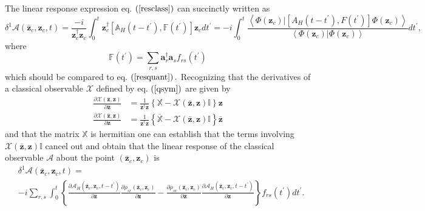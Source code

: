 \documentclass[aps,preprint]{revtex4}%
\begin{document}
The linear response expression eq. $\left(  \ref{resclass}\right)  $ can
succinctly written as
\begin{equation}
\delta^{1}\mathcal{A}\left(  \mathbf{\bar{z}}_{c},\mathbf{z}_{c},t\right)
=\frac{-i}{\mathbf{z}_{c}^{\dagger}\mathbf{z}_{c}}\int_{0}^{t}\mathbf{z}%
_{c}^{\dagger}\left[  \mathbb{A}_{H}\left(  t-t^{\prime}\right)
,\mathbb{F}\left(  t^{\prime}\right)  \right]  \mathbf{z}_{c}dt^{\prime
}=-i\int_{0}^{t}\frac{\left\langle \left.  \Phi\left(  \mathbf{z}_{c}\right)
\right\vert \left[  A_{H}\left(  t-t^{\prime}\right)  ,F\left(  t^{\prime
}\right)  \right]  \Phi\left(  \mathbf{z}_{c}\right)  \right\rangle
}{\left\langle \left.  \Phi\left(  \mathbf{z}_{c}\right)  \right\vert
\Phi\left(  \mathbf{z}_{c}\right)  \right\rangle }dt^{\prime},
\end{equation}
where
\begin{equation}
\mathbb{F}\left(  t^{\prime}\right)  =\sum_{r,s}\mathbf{a}_{r}^{\dagger
}\mathbf{a}_{s}f_{rs}\left(  t^{\prime}\right)
\end{equation}
which should be compared to eq. $\left(  \ref{resquant}\right)  .$ Recognizing
that the derivatives of a classical observable $\mathcal{X}$ defined by eq.
$\left(  \ref{qsym}\right)  $ are given by
\begin{align}
\frac{\partial\mathcal{X}\left(  \mathbf{\bar{z}},\mathbf{z}\right)
}{\partial\mathbf{\bar{z}}}  &  =\frac{1}{\mathbf{z}^{\dagger}\mathbf{z}%
}\left\{  \mathbb{X}-\mathcal{X}\left(  \mathbf{\bar{z},z}\right)
\mathbb{I}\right\}  \mathbf{z}\nonumber\\
\frac{\partial\mathcal{X}\left(  \mathbf{\bar{z}},\mathbf{z}\right)
}{\partial\mathbf{z}}  &  =\frac{1}{\mathbf{z}^{\dagger}\mathbf{z}}\left\{
\overline{\mathbb{X}}-\mathcal{X}\left(  \mathbf{\bar{z},z}\right)
\mathbb{I}\right\}  \mathbf{\bar{z}}%
\end{align}
and that the matrix $\mathbb{X}$ is hermitian one can establish that the terms
involving $\mathcal{X}\left(  \mathbf{\bar{z},z}\right)  \mathbb{I}$ cancel
out and obtain that the linear response of the classical observable
$\mathcal{A}$ about the point $\left(  \mathbf{\bar{z}}_{c},\mathbf{z}%
_{c}\right)  $ is
\begin{align}
&  \delta^{1}\mathcal{A}\left(  \mathbf{\bar{z}}_{c},\mathbf{z}_{c},t\right)
=\nonumber\\
&  -i\sum_{r,s}\int_{0}^{t}\left\{  \frac{\partial\mathcal{A}_{H}\left(
\mathbf{\bar{z}}_{c},\mathbf{z}_{c},t-t^{\prime}\right)  }{\partial
\mathbf{\bar{z}}}\frac{\partial\rho_{sr}\left(  \mathbf{\bar{z}}%
_{c},\mathbf{z}_{c}\right)  }{\partial\mathbf{z}}-\frac{\partial\rho
_{sr}\left(  \mathbf{\bar{z}}_{c},\mathbf{z}_{c}\right)  }{\partial
\mathbf{\bar{z}}}\frac{\partial\mathcal{A}_{H}\left(  \mathbf{\bar{z}}%
_{c},\mathbf{z}_{c},t-t^{\prime}\right)  }{\partial\mathbf{z}}\right\}
f_{rs}\left(  t^{\prime}\right)  dt^{\prime}.
\end{align}
\end{document}
